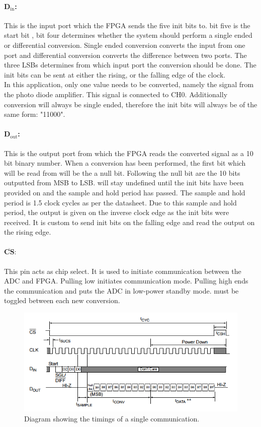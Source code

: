 \paragraph{D$_\text{in}$:}
This is the input port which the FPGA sends the five init bits to. 
bit five is the start bit ,  bit four determines whether the system should perform a single ended or differential conversion. 
Single ended conversion converts the input from one port and differential conversion converts the difference between two ports. 
The three LSBs determines from which input port the conversion should be done.
The init bits can be sent at either the rising, or the falling edge of the clock.\\

In this application, only one value needs to be converted, namely the signal from the photo diode amplifier. 
This signal is connected to CH0.
Additionally conversion will always be single ended, therefore the init bits will always be of the same form: "11000".

\paragraph{D$_\text{out}$:}
This is the output port from which the FPGA reads the converted signal as a 10 bit binary number. 
When a conversion has been performed,  the first bit which will be read from \dout will be the a null bit.
Following the null bit are the 10 bits outputted from MSB to LSB. 
\dout will stay undefined until the init bits have been provided on \din and the sample and hold period has passed. 
The sample and hold period is 1.5 clock cycles as per the datasheet. 
Due to this sample and hold period, the output is given on the inverse clock edge as the init bits were received.
It is custom to send init bits on the falling edge and read the output on the rising edge.


\paragraph{$\overline{\textbf{CS}}:$}
This pin acts as chip select. It is used to initiate communication between the ADC and FPGA.
Pulling \cs low initiates communication mode. Pulling \cs high ends the communication and puts the ADC in low-power standby mode.  
\cs must be toggled between each new conversion. 
 
\begin{figure}[h!]
	\centering
	\includegraphics[width=\linewidth]{images/timing}
	\caption{Diagram showing the timings of a single communication.}
	\label{fig:timing}
\end{figure}

